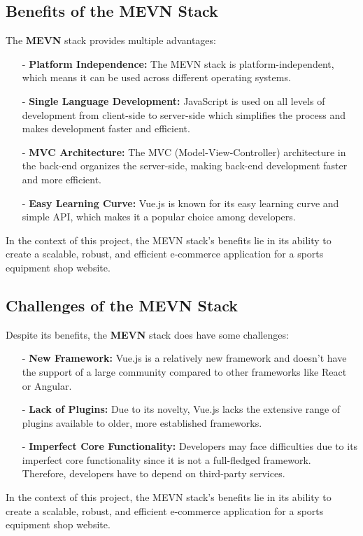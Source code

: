 \subsection{Benefits of the MEVN Stack}
The \textbf{MEVN} stack provides multiple advantages:
\begin{itemize}
    \item[-] \textbf{Platform Independence:} The MEVN stack is platform-independent, which means it can be used across different operating systems.
    \item[-] \textbf{Single Language Development:} JavaScript is used on all levels of development from client-side to server-side which simplifies the process and makes development faster and efficient.
    \item[-] \textbf{MVC Architecture:} The MVC (Model-View-Controller) architecture in the back-end organizes the server-side, making back-end development faster and more efficient.
    \item[-] \textbf{Easy Learning Curve:} Vue.js is known for its easy learning curve and simple API, which makes it a popular choice among developers.
\end{itemize}
In the context of this project, the MEVN stack's benefits lie in its ability to create a scalable, robust, and efficient e-commerce application for a sports equipment shop website.

\subsection{Challenges of the MEVN Stack}
Despite its benefits, the  \textbf{MEVN} stack does have some challenges:
\begin{itemize}
    \item[-] \textbf{New Framework:} Vue.js is a relatively new framework and doesn't have the support of a large community compared to other frameworks like React or Angular.
    \item[-] \textbf{Lack of Plugins:} Due to its novelty, Vue.js lacks the extensive range of plugins available to older, more established frameworks.
    \item[-] \textbf{Imperfect Core Functionality:} Developers may face difficulties due to its imperfect core functionality since it is not a full-fledged framework. Therefore, developers have to depend on third-party services.
\end{itemize}
In the context of this project, the MEVN stack's benefits lie in its ability to create a scalable, robust, and efficient e-commerce application for a sports equipment shop website.
